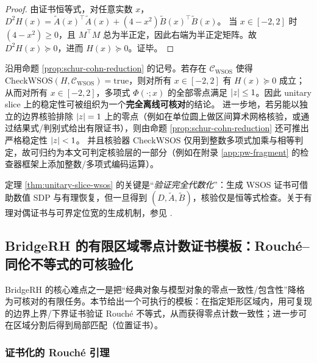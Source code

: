 \begin{proof}
由证书恒等式，对任意实数 $x$，
$
D^2H(x)=\widetilde{A}(x)^\top\widetilde{A}(x)+(4-x^2)\widetilde{B}(x)^\top\widetilde{B}(x)
$。
当 $x\in[-2,2]$ 时 $(4-x^2)\ge 0$，且 $M^\top M$ 总为半正定，因此右端为半正定矩阵。故 $D^2H(x)\succeq 0$，进而 $H(x)\succeq 0$。证毕。
\end{proof}

\begin{theorem}\label{thm:unitary-slice-wsos}
沿用命题 \ref{prop:schur-cohn-reduction} 的记号。若存在 $\mathcal{C}_{\mathrm{WSOS}}$ 使得 $\mathrm{CheckWSOS}(H,\mathcal{C}_{\mathrm{WSOS}})=\mathrm{true}$，则对所有 $x\in[-2,2]$ 有 $H(x)\succeq 0$ 成立；从而对所有 $x\in[-2,2]$，多项式 $\Phi(\cdot;x)$ 的全部零点满足 $\left\lvert z\right\rvert\le 1$。因此 unitary slice 上的稳定性可被组织为一个\textbf{完全离线可核对}的结论。
进一步地，若另能以独立的边界核验排除 $\left\lvert z\right\rvert=1$ 上的零点（例如在单位圆上做区间算术网格核验，或通过结果式/判别式给出有限证书），则由命题 \ref{prop:schur-cohn-reduction} 还可推出严格稳定性 $\left\lvert z\right\rvert<1$。
并且核验器 $\mathrm{CheckWSOS}$ 仅用到整数多项式加乘与相等判定，故可归约为本文可判定核验层的一部分（例如在附录 \ref{app:pw-fragment} 的检查器框架上添加整数/多项式编码运算）。
\end{theorem}

\begin{remark}[证书生成与有理恢复]
定理 \ref{thm:unitary-slice-wsos} 的关键是“\emph{验证完全代数化}”：生成 WSOS 证书可借助数值 SDP 与有理恢复，但一旦得到 $(D,\widetilde{A},\widetilde{B})$，核验仅是恒等式检查。关于有理对偶证书与可界定位宽的生成机制，参见 \cite{DavisPapp2023}.
\end{remark}

\subsection{BridgeRH 的有限区域零点计数证书模板：Rouché--同伦不等式的可核验化}\label{app:rouche-certificate}

BridgeRH 的核心难点之一是把“经典对象与模型对象的零点一致性/包含性”降格为可核对的有限任务。本节给出一个可执行的模板：在指定矩形区域内，用可复现的边界上界/下界证书验证 Rouché 不等式，从而获得零点计数一致性；进一步可在区域分割后得到局部匹配（位置证书）。

\subsubsection{证书化的 Rouché 引理}

